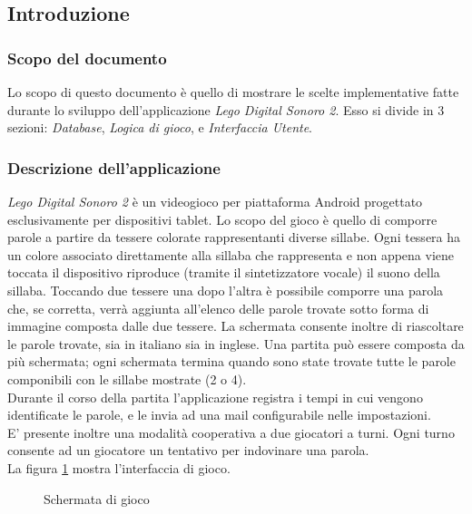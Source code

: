 


\subsection{Introduzione}


\subsubsection{Scopo del documento}
Lo scopo di questo documento è quello di mostrare le scelte implementative fatte durante lo sviluppo dell'applicazione \textit{Lego Digital Sonoro 2}. Esso si divide in $3$ sezioni: \textit{Database}, \textit{Logica di gioco}, e \textit{Interfaccia Utente}.

\subsubsection{Descrizione dell'applicazione}
\textit{Lego Digital Sonoro 2} è un videogioco per piattaforma Android progettato esclusivamente per dispositivi tablet. Lo scopo del gioco è quello di comporre parole a partire da tessere colorate rappresentanti diverse sillabe. Ogni tessera ha un colore associato direttamente alla sillaba che rappresenta e non appena viene toccata il dispositivo riproduce (tramite il sintetizzatore vocale) il suono della sillaba. Toccando due tessere una dopo l'altra è possibile comporre una parola che, se corretta, verrà aggiunta all'elenco delle parole trovate sotto forma di immagine composta dalle due tessere. La schermata consente inoltre di riascoltare le parole trovate, sia in italiano sia in inglese. Una partita può essere composta da più schermata; ogni schermata termina quando sono state trovate tutte le parole componibili con le sillabe mostrate (2 o 4).\\
Durante il corso della partita l'applicazione registra i tempi in cui vengono identificate le parole, e le invia ad una mail configurabile nelle impostazioni.\\
E' presente inoltre una modalità cooperativa a due giocatori a turni. Ogni turno consente ad un giocatore un tentativo per indovinare una parola.\\
La figura \ref{fig:play_ui} mostra l'interfaccia di gioco.

\begin{figure}[h!]
\label{fig:play_ui}
  \centering
  \caption{Schermata di gioco}
\end{figure}

